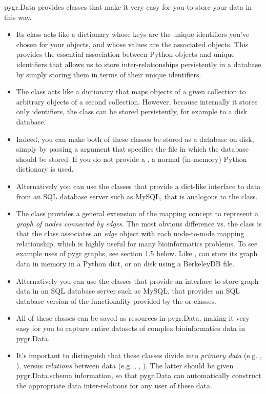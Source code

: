 \documentclass{howto}
\begin{document}
pygr.Data provides classes that make it very easy for you to store your
data in this way.  
\begin{itemize}
\item Its  class acts like a dictionary
whose keys are the unique identifiers you've chosen for your objects,
and whose values are the associated objects.  This provides the essential
association between Python objects and unique identifiers that allows
us to store inter-relationships persistently in a database by simply
storing them in terms of their unique identifiers.

\item The  class
acts like a dictionary that maps objects of a given collection to
arbitrary objects of a second collection.  However, because internally
it stores only identifiers, the  class can be stored
persistently, for example to a disk database.  

\item Indeed, you can make both of
these classes be stored as a database on disk, simply by passing a 
argument that specifies the file in which the database should be stored.
If you do not provide a , a normal (in-memory) Python dictionary
is used.  

\item Alternatively you can use the  classes that
provide a dict-like interface to data from an SQL database server
such as MySQL, that is analogous to the  class.

\item The  class provides a general extension of the
mapping concept to represent a {\em graph of nodes connected by edges}.
The most obvious difference vs. the  class is that 
the  class associates an {\em edge} object with each
node-to-node mapping relationship, which is highly useful for many
bioinformatics problems.  To see example uses of pygr graphs, see
section 1.5 below.  Like ,  can store its graph data
in memory in a Python dict, or on disk using a BerkeleyDB file.

\item Alternatively you can use the  classes that
provide an interface to store graph data in an SQL database server
such as MySQL, that provides an SQL database version of the functionality
provided by the  or  classes.

\item All of these classes can be saved as resources in pygr.Data, making
it very easy for you to capture entire datasets of complex bioinformatics
data in pygr.Data.

\item It's important to distinguish that these classes divide into
{\em primary data} (e.g. , ), versus
{\em relations} between data (e.g. , ,
).  The latter should be given pygr.Data.schema information,
so that pygr.Data can automatically construct the appropriate data inter-relations
for any user of these data.

\end{itemize}
\end{document}
